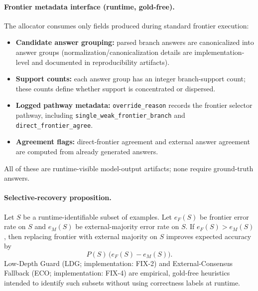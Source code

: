 \paragraph{Frontier metadata interface (runtime, gold-free).}
The allocator consumes only fields produced during standard frontier execution:
\begin{itemize}[nosep,leftmargin=1.5em]
  \item \textbf{Candidate answer grouping:} parsed branch answers are canonicalized into answer groups (normalization/canonicalization details are implementation-level and documented in reproducibility artifacts).
  \item \textbf{Support counts:} each answer group has an integer branch-support count; these counts define whether support is concentrated or dispersed.
  \item \textbf{Logged pathway metadata:} \texttt{override\_reason} records the frontier selector pathway, including \texttt{single\_weak\_frontier\_branch} and \texttt{direct\_frontier\_agree}.
  \item \textbf{Agreement flags:} direct-frontier agreement and external answer agreement are computed from already generated answers.
\end{itemize}
All of these are runtime-visible model-output artifacts; none require ground-truth answers.

\paragraph{Selective-recovery proposition.}
Let $S$ be a runtime-identifiable subset of examples. Let $e_F(S)$ be frontier error rate on $S$ and $e_M(S)$ be external-majority error rate on $S$. If $e_F(S) > e_M(S)$, then replacing frontier with external majority on $S$ improves expected accuracy by
\[
P(S)\,\big(e_F(S)-e_M(S)\big).
\]
Low-Depth Guard (LDG; implementation: FIX-2) and External-Consensus Fallback (ECO; implementation: FIX-4) are empirical, gold-free heuristics intended to identify such subsets without using correctness labels at runtime.


